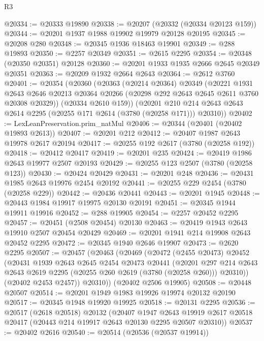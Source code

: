 \begin{lexlean}{R3}
\begin{coremodule}
@20334 := @20333 @19890
@20338 := @20207 (@20332 (@20334 @20123 @159))
@20344 := @20201 @1937 @1988 @19902 @19979 @20128 @20195
@20345 := @20208 @280
@20348 := @20345 @1936 @18463 @19901
@20349 := @288 @19893
@20350 := @2257 @20349
@20351 := @2615 @2295
@20354 := @20348 (@20350 @20351) @20128
@20360 := @20201 @1933 @1935 @2666 @2645 @20349 @20351
@20363 := @20209 @1932 @2664 @2643
@20364 := @2612 @3760
@20401 := @20354
    (@20360
      (@20363
        (@20214 @20364)
        @20349
        (@20221
          @1931
          @2643
          @2646
          @20213
          @20364
          @20266
          (@20298 @292 @2643 @2645 @2611 @3760 @20308 @20329))
        (@20334 @2610 @159))
      (@20201 @210 @214 @2643 @2643 @2614 @2295 (@20255 @171 @2614 (@3780 (@20258 @171))) @20310))
@20402 := LexLeanPreservation.prim_natMul
@20406 := @20344 (@20401 (@20402 @19893 @2613))
@20407 := @20201 @212
@20412 := @20407 @1987 @2643 @19978 @2617 @20194
@20417 := @20255 @192 @2617 (@3780 (@20258 @192))
@20418 := @20412 @20417
@20419 := @20201 @235
@20424 := @20419 @1986 @2643 @19977 @2507 @20193
@20429 := @20255 @123 @2507 (@3780 (@20258 @123))
@20430 := @20424 @20429
@20431 := @20201 @248
@20436 := @20431 @1985 @2643 @19976 @2454 @20192
@20441 := @20255 @229 @2454 (@3780 (@20258 @229))
@20442 := @20436 @20441
@20443 := @20201 @1945
@20448 := @20443 @1984 @19917 @19975 @20130 @20191
@20451 := @20345 @1944 @19911 @19916
@20452 := @288 @19905
@20454 := @2257 @20452 @2295
@20457 := @20451 (@2508 @20454) @20130
@20463 := @20419 @1943 @2643 @19910 @2507 @20454 @20429
@20469 := @20201 @1941 @214 @19908 @2643 @20452 @2295
@20472 := @20345 @1940 @2646 @19907
@20473 := @2620 @2295
@20507 := @20457
    (@20463
      (@20469
        (@20472
          (@2455 @20473)
          @20452
          (@20431
            @1939
            @2643
            @2645
            @2454
            @20473
            @20441
            (@20201
              @297
              @214
              @2643
              @2643
              @2619
              @2295
              (@20255 @260 @2619 (@3780 (@20258 @260)))
              @20310))
          (@20402 @2453 @2457))
        @20310))
    (@20402 @2506 @19905)
@20508 := @20448 @20507
@20514 := @20201 @1949 @1983 @19926 @19974 @20132 @20190
@20517 := @20345 @1948 @19920 @19925
@20518 := @20131 @2295
@20536 := @20517
    (@2618 @20518)
    @20132
    (@20407
      @1947
      @2643
      @19919
      @2617
      @20518
      @20417
      (@20443 @214 @19917 @2643 @20130 @2295 @20507 @20310))
@20537 := @20402 @2616
@20540 := @20514 (@20536 (@20537 @19914))

\end{coremodule}
\end{lexlean}
